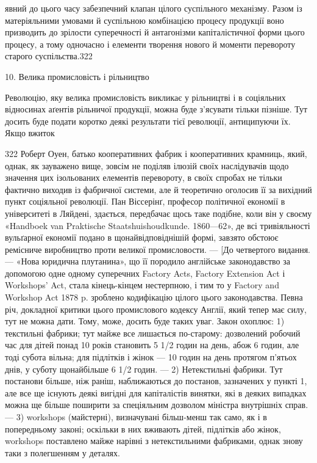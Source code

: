 явний до цього часу забезпечний клапан цілого суспільного
механізму. Разом із матеріяльними умовами й суспільною комбінацією
процесу продукції воно призводить до зрілости суперечності
й антагонізми капіталістичної форми цього процесу,
а тому одночасно і елементи творення нового й моменти перевороту
старого суспільства.322

10. Велика промисловість і рільництво

Революцію, яку велика промисловість викликає у рільництві
і в соціяльних відносинах аґентів рільничої продукції, можна
буде з’ясувати тільки пізніше. Тут досить буде подати коротко
деякі результати тієї революції, антиципуючи їх. Якщо вжиток

322 Роберт Оуен, батько кооперативних фабрик і кооперативних
крамниць, який, однак, як зауважено вище, зовсім не поділяв ілюзій
своїх наслідувачів щодо значення цих ізольованих елементів перевороту,
в своїх спробах не тільки фактично виходив із фабричної системи,
але й теоретично оголосив її за вихідний пункт соціяльної революції.
Пан Віссерінґ, професор політичної економії в університеті в Ляйдені,
здається, передбачає щось таке подібне, коли він у своєму «Handboek
van Praktische Staatshuishoudkunde. 1860—62», де всі тривіяльності
вульґарної економії подано в щонайвідповіднішій формі, завзято обстоює
ремісниче виробництво проти великої промисловости. — [До четвертого видання.
— «Нова юридична плутанина», що її породило англійське законодавство
за допомогою одне одному суперечних Factory Acts, Factory
Extension Act і Workshops’ Act, стала кінець-кінцем нестерпною, і
тим то у Factory and Workshop Act 1878 p. зроблено кодифікацію цілого
цього законодавства. Певна річ, докладної критики цього промислового
кодексу Англії, який тепер має силу, тут не можна дати. Тому, може,
досить буде таких уваг. Закон охоплює: 1) текстильні фабрики; тут
майже все лишається по-старому: дозволений робочий час для дітей
понад 10 років становить 5 1/2 годин на день, абож 6 годин, але тоді субота
вільна; для підлітків і жінок — 10 годин на день протягом п’ятьох
днів, у суботу щонайбільше 6 1/2 годин. — 2) Нетекстильні фабрики. Тут
постанови більше, ніж раніш, наближаються до постанов, зазначених у
пункті 1, але все ще існують деякі вигідні для капіталістів винятки, які
в деяких випадках можна ще більше поширити за спеціяльним дозволом
міністра внутрішніх справ. — 3) workshops (майстерні), визначувані
більш-менш так само, як і в попередньому законі; оскільки в них вживають
дітей, підлітків або жінок, workshops поставлено майже нарівні
з нетекстильними фабриками, однак знову таки з полегшенням у деталях.
